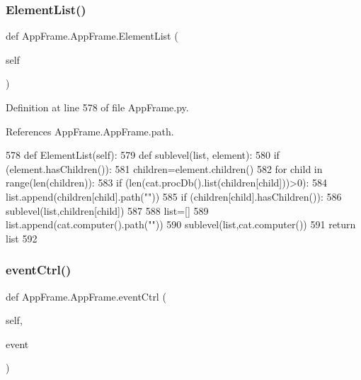 \subsubsection{\texorpdfstring{Element\+List()}{ElementList()}}
{\footnotesize\ttfamily def App\+Frame.\+App\+Frame.\+Element\+List (\begin{DoxyParamCaption}\item[{}]{self }\end{DoxyParamCaption})}



Definition at line 578 of file App\+Frame.\+py.



References App\+Frame.\+App\+Frame.\+path.


\begin{DoxyCode}
578     \textcolor{keyword}{def }ElementList(self):
579         \textcolor{keyword}{def }sublevel(list, element):
580             \textcolor{keywordflow}{if} (element.hasChildren()):
581                 children=element.children()
582                 \textcolor{keywordflow}{for} child \textcolor{keywordflow}{in} range(len(children)):
583                     \textcolor{keywordflow}{if} (len(cat.procDb().list(children[child]))>0):
584                        list.append(children[child].path(\textcolor{stringliteral}{""}))
585                     \textcolor{keywordflow}{if} (children[child].hasChildren()):
586                         sublevel(list,children[child])
587 
588         list=[]
589         list.append(cat.computer().path(\textcolor{stringliteral}{""}))
590         sublevel(list,cat.computer())
591         \textcolor{keywordflow}{return} list
592             
\end{DoxyCode}
\mbox{\label{classAppFrame_1_1AppFrame_a471575e362393de2032656c5139e1a6f}} 
\subsubsection{\texorpdfstring{event\+Ctrl()}{eventCtrl()}}
{\footnotesize\ttfamily def App\+Frame.\+App\+Frame.\+event\+Ctrl (\begin{DoxyParamCaption}\item[{}]{self,  }\item[{}]{event }\end{DoxyParamCaption})}



